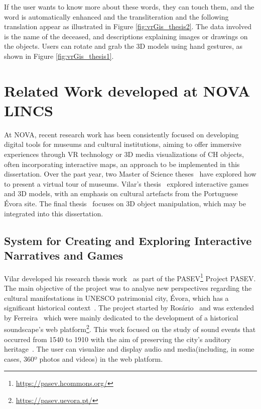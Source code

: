 If the user wants to know more about these words, they can touch them, and the word is automatically enhanced and the transliteration and the following translation appear as illustrated in Figure \ref{fig:vrGis_thesis2}. The data involved is the name of the deceased, and descriptions explaining images or drawings on the objects.
Users can rotate and grab the \gls{3D} models using hand gestures, as shown in Figure \ref{fig:vrGis_thesis1}.
\FloatBarrier

\section{Related Work developed at NOVA LINCS}
\label{sec:thesis_nova}

At NOVA, recent research work has been consistently focused on developing digital tools for museums and cultural institutions, aiming to offer immersive experiences through \gls{VR} technology or \gls{3D} media visualizations 
of \gls{CH} objects, often incorporating interactive maps, an approach to be implemented in this dissertation. Over the past year, two Master of Science theses~\cite{tese_tourCoimbra2024,tese_tourFaria2024}  have explored how to 
present a virtual tour of museums. Vilar's thesis~\cite{tese_jogosVilar2022} explored interactive games and \gls{3D} models, with an emphasis on cultural artefacts from the Portuguese Évora site. 
The final thesis~\cite{campanha2024heritage} focuses on \gls{3D} object manipulation, which may be integrated into this dissertation.


\subsection{System for Creating and Exploring Interactive Narratives and Games}
\label{sec:thesis1_nova}

Vilar developed his research thesis work~\cite{tese_jogosVilar2022} as part of the PASEV\footnote{\url{https://pasev.hcommons.org/}} Project \gls{PASEV}. 
The main objective of the project was to analyse new perspectives regarding the cultural manifestations in UNESCO patrimonial city, Évora,
which has a significant historical context~\cite{vilar2024extended}. The project started by Rosário~\cite{rosario2021responsive} and was extended by Ferreira~\cite{Ferreira2021} which were mainly dedicated to the development of a historical soundscape's web platform\footnote{\url{https://pasev.uevora.pt/}}. 
This work focused on the study of sound events that occurred from 1540 to 1910 with the aim of preserving the city's auditory heritage~\cite{rodrigues2021using}. The user can
visualize and display audio and media(including, in some cases, 360º photos and videos) in the web platform.

